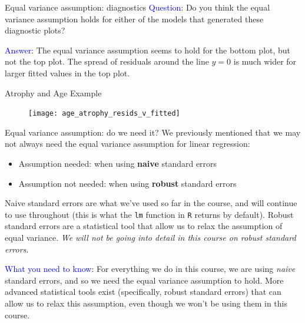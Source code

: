 \documentclass[10pt,t]{beamer}
\begin{document}
\begin{frame}{Equal variance assumption: diagnostics}
\textcolor{blue}{Question:} Do you think the equal variance assumption holds for either of the models that generated these diagnostic plots?

\vspace{0.3cm}

\textcolor{blue}{Answer:} The equal variance assumption seems to hold for the bottom plot, but not the top plot. The spread of residuals around the line $y = 0$ is much wider for larger fitted values in the top plot. 
\end{frame}

\begin{frame}{Atrophy and Age Example}
	\begin{figure}
		\centering
		\texttt{[image: age\_atrophy\_resids\_v\_fitted]}
	\end{figure}
	\medskip
	
\end{frame}


\begin{frame}{Equal variance assumption: do we need it?}
We previously mentioned that we may not always need the equal variance assumption for linear regression:

\vspace{0.3cm}

\begin{itemize}
	\item Assumption needed: when using \textbf{naive} standard errors 
	\item Assumption not needed: when using \textbf{robust} standard errors
\end{itemize}

\vspace{0.3cm}

Naive standard errors are what we've used so far in the course, and will continue to use throughout (this is what the \texttt{lm} function in \texttt{R} returns by default). Robust standard errors are a statistical tool that allow us to relax the assumption of equal variance. \textit{We will not be going into detail in this course on robust standard errors.}

\vspace{0.3cm}

\small \textcolor{blue}{What you need to know:} For everything we do in this course, we are using \textit{naive} standard errors, and so we need the equal variance assumption to hold. More advanced statistical tools exist (specifically, robust standard errors) that can allow us to relax this assumption, even though we won't be using them in this course.

\end{frame}
\end{document}
